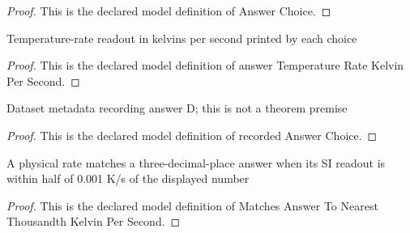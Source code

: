 \begin{proof}
  This is the declared model definition of Answer Choice.
\end{proof}
\begin{definition}
  \label{def:physics:phyx-mini-0156:phyxminiproblems-problemphyxmini0156-answertemperatureratekelvinpersecond}
  Temperature-rate readout in kelvins per second printed by each choice
\end{definition}
\begin{proof}
  This is the declared model definition of answer Temperature Rate Kelvin Per Second.
\end{proof}
\begin{definition}
  \label{def:physics:phyx-mini-0156:phyxminiproblems-problemphyxmini0156-recordedanswerchoice}
  Dataset metadata recording answer D; this is not a theorem premise
\end{definition}
\begin{proof}
  This is the declared model definition of recorded Answer Choice.
\end{proof}
\begin{definition}
  \label{def:physics:phyx-mini-0156:phyxminiproblems-problemphyxmini0156-matchesanswertonearestthousandthkelvinpersecond}
  A physical rate matches a three-decimal-place answer when its SI readout is within half of 0.001 K/s of the displayed number
\end{definition}
\begin{proof}
  This is the declared model definition of Matches Answer To Nearest Thousandth Kelvin Per Second.
\end{proof}
